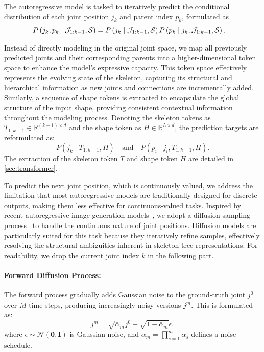 The autoregressive model is tasked to iteratively predict the conditional distribution of each joint position $j_k$ and parent index $p_k$, formulated as
\begin{align*}
P\left(j_k, p_k \mid \mathcal{J}_{1:k-1}, \mathcal{S}\right)
& = P\left(j_k\mid \mathcal{J}_{1:k-1}, \mathcal{S}\right) P\left(p_k\mid j_k, \mathcal{J}_{1:k-1}, \mathcal{S}\right).
\end{align*}
 
Instead of directly modeling in the original joint space, we map all previously predicted joints and their corresponding parents into a higher-dimensional token space to enhance the model's expressive capacity. This token space effectively represents the evolving state of the skeleton, capturing its structural and hierarchical information as new joints and connections are incrementally added. Similarly, a sequence of shape tokens is extracted to encapsulate the global structure of the input shape, providing consistent contextual information throughout the modeling process. Denoting the skeleton tokens as $T_{1:k-1}\in\mathbb{R}^{(k-1)\times d}$ and the shape token as $H\in\mathbb{R}^{L\times d}$, the prediction targets are reformulated as:  
\begin{equation}
P(j_k \mid T_{1:k-1}, H) \quad \text{and} \quad P(p_i \mid j_i, T_{1:k-1}, H).
\end{equation}
The extraction of the skeleton token $T$ and shape token $H$ are detailed in \cref{sec:transformer}.

To predict the next joint position, which is continuously valued, we address the limitation that most autoregressive models are traditionally designed for discrete outputs, making them less effective for continuous-valued tasks. Inspired by recent autoregressive image generation models~\cite{li2024autoregressive}, we adopt a diffusion sampling process~\cite{ho2020denoising, nichol2021improved, dhariwal2021diffusion} to handle the continuous nature of joint positions. Diffusion models are particularly suited for this task because they iteratively refine samples, effectively resolving the structural ambiguities inherent in skeleton tree representations.
For readability, we drop the current joint index $k$ in the following part.

\paragraph{Forward Diffusion Process:}
The forward process gradually adds Gaussian noise to the ground-truth joint \(j^0\) over \(M\) time steps, producing increasingly noisy versions \(j^m\). This is formulated as:
\[
j^m = \sqrt{\bar{\alpha}_m} j^0 + \sqrt{1 - \bar{\alpha}_m} \epsilon,
\]
where \(\epsilon \sim \mathcal{N}(\mathbf{0}, \mathbf{I})\) is Gaussian noise, and \(\bar{\alpha}_m = \prod_{s=1}^m \alpha_s\) defines a noise schedule.

